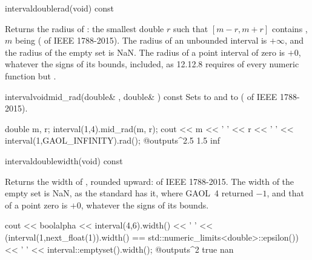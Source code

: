 \begin{defmethod}{interval}{double}{rad}{(void) const}
  \begin{operation}
  \end{operation}
  Returns the radius of : the smallest double $r$ such that
  $[m-r,m+r]$ contains , $m$ being 
  ( of IEEE 1788-2015). The radius of an unbounded interval is
  $+\infty$, and the radius of the empty set is NaN. The radius of a point
  interval of zero is $+0$, whatever the signs of its bounds, 
  included, as 12.12.8 requires of every numeric function but
  .\newinvfive
\end{defmethod}

\begin{defmethod}{interval}{void}{mid\_rad}{(double\& , double\& ) const}
  Sets  to  and  to 
  ( of IEEE 1788-2015).\newinvfive
\begin{example}
double m, r;
interval(1,4).mid_rad(m, r);
cout << m << ' ' << r << ' ' << interval(1,GAOL_INFINITY).rad();
@outputs^2.5 1.5 inf~
\end{example}
\end{defmethod}

\begin{defmethod}{interval}{double}{width}{(void) const}
  \begin{operation}
  \end{operation}
  Returns the width of , rounded upward:  of IEEE
  1788-2015. The width of the empty set is NaN, as the standard has it,
  where GAOL~4 returned $-1$, and that of a point zero is $+0$, whatever the
  signs of its bounds.\newinvfive
\begin{example}
cout << boolalpha << interval(4,6).width() << ' '
     << (interval(1,next_float(1)).width()
         == std::numeric_limits<double>::epsilon()) << ' '
     << interval::emptyset().width();
@outputs^2 true nan~
\end{example}
\end{defmethod}

